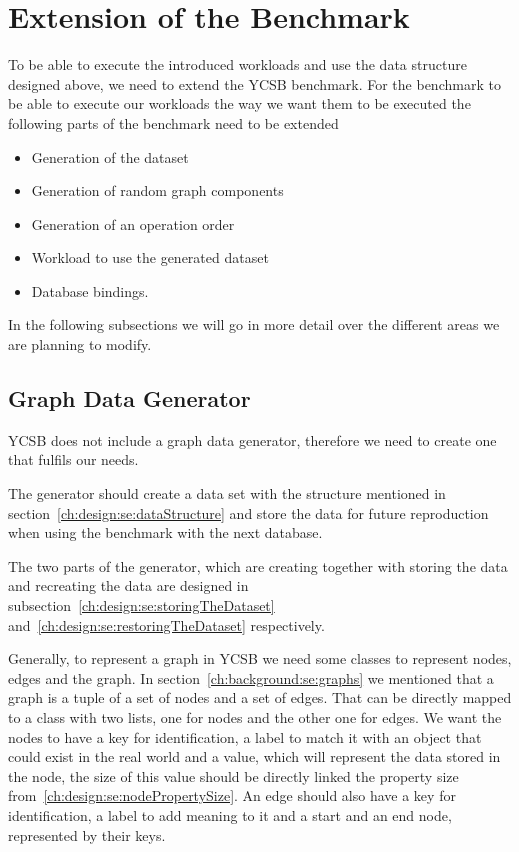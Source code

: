 \section{Extension of the Benchmark}
\label{ch:design:se:extensionOfTheBenchmark}
To be able to execute the introduced workloads and use the data structure designed above,
we need to extend the YCSB benchmark.
For the benchmark to be able to execute our workloads the way we want them to be executed the following parts of the benchmark need to be extended

\begin{itemize}
  \item Generation of the dataset
  \item Generation of random graph components
  \item Generation of an operation order
  \item Workload to use the generated dataset
  \item Database bindings.
\end{itemize}

In the following subsections we will go in more detail over the different areas we are planning to modify.

\subsection{Graph Data Generator}
YCSB does not include a graph data generator,
therefore we need to create one that fulfils our needs.

The generator should create a data set with the structure mentioned in section~\ref{ch:design:se:dataStructure} and store the data for future reproduction when using the benchmark with the next database.

The two parts of the generator,
which are creating together with storing the data and recreating the data are designed in subsection~\ref{ch:design:se:storingTheDataset} and~\ref{ch:design:se:restoringTheDataset} respectively.

Generally,
to represent a graph in YCSB we need some classes to represent nodes, edges and the graph.
In section~\ref{ch:background:se:graphs} we mentioned that a graph is a tuple of a set of nodes and a set of edges.
That can be directly mapped to a class with two lists,
one for nodes and the other one for edges.
We want the nodes to have a key for identification,
a label to match it with an object that could exist in the real world and a value,
which will represent the data stored in the node,
the size of this value should be directly linked the property size from~\ref{ch:design:se:nodePropertySize}.
An edge should also have a key for identification,
a label to add meaning to it and a start and an end node,
represented by their keys.


